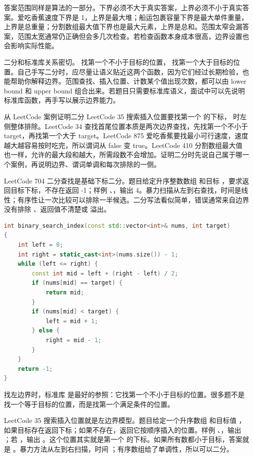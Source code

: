 答案范围同样是算法的一部分。下界必须不大于真实答案，上界必须不小于真实答案。爱吃香蕉速度下界是 1，上界是最大堆；船运包裹容量下界是最大单件重量，上界是总重量；分割数组最大值下界也是最大元素，上界是总和。范围太窄会漏答案，范围太宽通常仍正确但会多几次检查。若检查函数本身成本很高，边界设置也会影响实际性能。

二分和标准库关系密切。  找第一个不小于目标的位置， 找第一个大于目标的位置。自己手写二分时，应尽量让语义贴近这两个函数，因为它们经过长期检验，也能帮助你解释边界。范围查找、插入位置、计数某个值出现次数，都可以由 lower bound 和 upper bound 组合出来。若题目只需要标准库语义，面试中可以先说明标准库函数，再手写以展示边界能力。

\begin{principlebox}{从 LeetCode 案例证明二分}
LeetCode 35 搜索插入位置要找第一个  的下标， 时左侧整体排除。LeetCode 34 查找首尾位置本质是两次边界查找，先找第一个不小于 target，再找第一个大于 target。LeetCode 875 爱吃香蕉要找最小可行速度，速度越大越容易按时吃完，所以谓词从 false 变 true。LeetCode 410 分割数组最大值也一样，允许的最大段和越大，所需段数不会增加。证明二分时先说自己属于哪一个案例，再说明边界、谓词单调和每次排除的一侧。
\end{principlebox}

LeetCode 704 二分查找是基础下标二分。题目给定升序整数数组  和目标 ，要求返回目标下标，不存在返回 -1；样例 、，输出 4。暴力扫描从左到右查找，时间是线性；有序性让一次比较可以排除一半候选。二分写法看似简单，错误通常来自边界没有排除 、返回值不清楚或  溢出。

\begin{lstlisting}[language=C++,caption={LeetCode 704 二分查找：基础写法}]
int binary_search_index(const std::vector<int>& nums, int target)
{
    int left = 0;
    int right = static_cast<int>(nums.size()) - 1;
    while (left <= right) {
        const int mid = left + (right - left) / 2;
        if (nums[mid] == target) {
            return mid;
        }
        if (nums[mid] < target) {
            left = mid + 1;
        } else {
            right = mid - 1;
        }
    }
    return -1;
}
\end{lstlisting}

找左边界时，标准库  是最好的参照：它找第一个不小于目标的位置。很多题不是找一个等于目标的位置，而是找第一个满足条件的位置。

LeetCode 35 搜索插入位置就是左边界模型。题目给定一个升序数组  和目标值 ，如果目标存在返回下标；如果不存在，返回它按顺序插入的位置。样例 、，输出 ；若 ，输出 。这个位置其实就是第一个  的下标。如果所有数都小于目标，答案就是 。暴力方法从左到右扫描，时间 ；有序数组给了单调性，所以可以二分。

